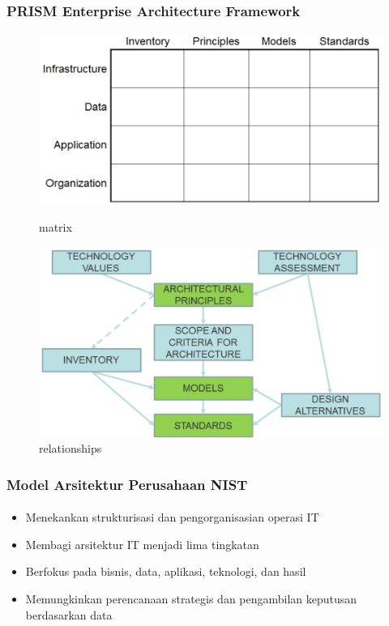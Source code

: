 \documentclass[aspectratio=169, table]{beamer}
\begin{document}
	{
		\begin{frame}
			\frametitle{PRISM Enterprise Architecture Framework}
			\begin{center}

				\begin{figure}[ht]
					\begin{minipage}[b]{0.49\linewidth}
						\centering
						\includegraphics[width=\textwidth]{../figures/prism_matrix}
						\caption{matrix}
					\end{minipage}
					\hfill
					\begin{minipage}[b]{0.49\linewidth}
						\centering
						\includegraphics[width=\textwidth]{../figures/prism_relationships}
						\caption{relationships}
					\end{minipage}
				\end{figure}

			\end{center}
		\end{frame}
	}

	\begin{frame}
		\frametitle{Model Arsitektur Perusahaan NIST}
        \framesubtitle{\hspace{1cm}}
		\begin{itemize}
			\item Menekankan strukturisasi dan pengorganisasian operasi IT
			\item Membagi arsitektur IT menjadi lima tingkatan
			\item Berfokus pada bisnis, data, aplikasi, teknologi, dan hasil
			\item Memungkinkan perencanaan strategis dan pengambilan keputusan berdasarkan data
		\end{itemize}
	\end{frame}
\end{document}
